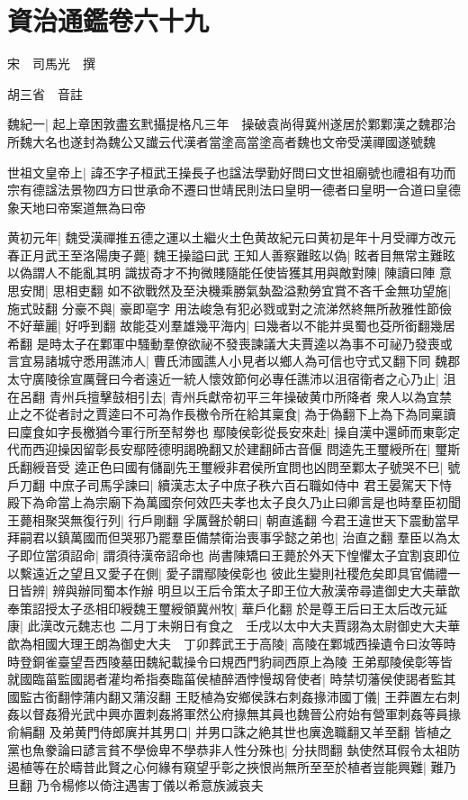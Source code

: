 \chapter{資治通鑑卷六十九}
宋　司馬光　撰

胡三省　音註

魏紀一|{
	起上章困敦盡玄黓攝提格凡三年　操破袁尚得冀州遂居於鄴鄴漢之魏郡治所魏大名也遂封為魏公又䜟云代漢者當塗高當塗高者魏也文帝受漢禪國遂號魏}


世祖文皇帝上|{
	諱丕字子桓武王操長子也諡法學勤好問曰文世祖廟號也禮祖有功而宗有德諡法景物四方曰世承命不遷曰世靖民則法曰皇明一德者曰皇明一合道曰皇德象天地曰帝案道無為曰帝}


黄初元年|{
	魏受漢禪推五德之運以土繼火土色黄故紀元曰黄初是年十月受禪方改元}
春正月武王至洛陽庚子薨|{
	魏王操謚曰武}
王知人善察難眩以偽|{
	眩者目無常主難眩以偽謂人不能亂其明}
識拔奇才不拘微賤隨能任使皆獲其用與敵對陳|{
	陳讀曰陣}
意思安閒|{
	思相吏翻}
如不欲戰然及至決機乘勝氣埶盈溢勲勞宜賞不吝千金無功望施|{
	施式䜴翻}
分豪不與|{
	豪即亳字}
用法峻急有犯必戮或對之流涕然終無所赦雅性節儉不好華麗|{
	好呼到翻}
故能芟刈羣雄幾平海内|{
	曰幾者以不能并吳蜀也芟所銜翻幾居希翻}
是時太子在鄴軍中騷動羣僚欲祕不發喪諫議大夫賈逵以為事不可祕乃發喪或言宜易諸城守悉用譙沛人|{
	曹氏沛國譙人小見者以鄉人為可信也守式又翻下同}
魏郡太守廣陵徐宣厲聲曰今者遠近一統人懷效節何必專任譙沛以沮宿衛者之心乃止|{
	沮在呂翻}
青州兵擅擊鼓相引去|{
	青州兵獻帝初平三年操破黄巾所降者}
衆人以為宜禁止之不從者討之賈逵曰不可為作長檄令所在給其稟食|{
	為于偽翻下上為下為同稟讀曰廩食如字長檄猶今軍行所至幇劵也}
鄢陵侯彰從長安來赴|{
	操自漢中還師而東彰定代而西迎操因留彰長安鄢陸德明謁晩翻又於建翻師古音偃}
問逵先王璽綬所在|{
	璽斯氏翻綬音受}
逵正色曰國有儲副先王璽綬非君侯所宜問也凶問至鄴太子號哭不巳|{
	號戶刀翻}
中庶子司馬孚諫曰|{
	續漢志太子中庶子秩六百石職如侍中}
君王晏駕天下恃殿下為命當上為宗廟下為萬國奈何效匹夫孝也太子良久乃止曰卿言是也時羣臣初聞王薨相聚哭無復行列|{
	行戶剛翻}
孚厲聲於朝曰|{
	朝直遙翻}
今君王違世天下震動當早拜嗣君以鎮萬國而但哭邪乃罷羣臣備禁衛治喪事孚懿之弟也|{
	治直之翻}
羣臣以為太子即位當須詔命|{
	謂須待漢帝詔命也}
尚書陳矯曰王薨於外天下惶懼太子宜割哀即位以繫遠近之望且又愛子在側|{
	愛子謂鄢陵侯彰也}
彼此生變則社稷危矣即具官備禮一日皆辨|{
	辨與辦同蜀本作辦}
明旦以王后令策太子即王位大赦漢帝尋遣御史大夫華歆奉策詔授太子丞相印綬魏王璽綬領冀州牧|{
	華戶化翻}
於是尊王后曰王太后改元延康|{
	此漢改元魏志也}
二月丁未朔日有食之　壬戌以太中大夫賈詡為太尉御史大夫華歆為相國大理王朗為御史大夫　丁卯葬武王于高陵|{
	高陵在鄴城西操遺令曰汝等時時登銅雀臺望吾西陵墓田魏紀載操令曰規西門豹祠西原上為陵}
王弟鄢陵侯彰等皆就國臨菑監國謁者灌均希指奏臨菑侯植醉酒悖慢刼脅使者|{
	時禁切藩侯使謁者監其國監古銜翻悖蒲内翻又蒲沒翻}
王貶植為安鄉侯誅右刺姦掾沛國丁儀|{
	王莽置左右刺姦以督姦猾光武中興亦置刺姦將軍然公府掾無其員也魏晉公府始有營軍刺姦等員掾俞絹翻}
及弟黄門侍郎廙并其男口|{
	并男口誅之絶其世也廙逸職翻又羊至翻}
皆植之黨也魚豢論曰諺言貧不學儉卑不學恭非人性分殊也|{
	分扶問翻}
埶使然耳假令太祖防遏植等在於疇昔此賢之心何緣有窺望乎彰之挾恨尚無所至至於植者豈能興難|{
	難乃旦翻}
乃令楊修以倚注遇害丁儀以希意族滅哀夫

